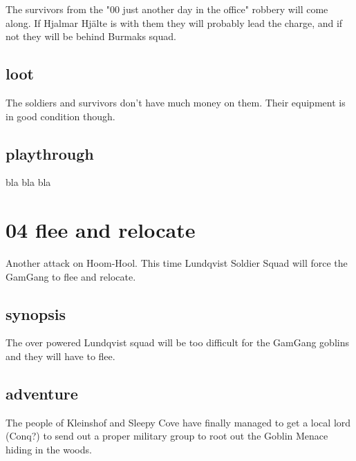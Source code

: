 The survivors from the "00 just another day in the office" robbery will come along. If Hjalmar Hjälte is with them they will probably lead the charge, and if not they will be behind Burmaks squad.


\subsection*{loot}

The soldiers and survivors don't have much money on them. Their equipment is in good condition though.


\subsection*{playthrough}

bla bla bla









\newpage
\section*{04 flee and relocate}


Another attack on Hoom-Hool. This time Lundqvist Soldier Squad will force the GamGang to flee and relocate.


\subsection*{synopsis}

The over powered Lundqvist squad will be too difficult for the GamGang goblins and they will have to flee.


\subsection*{adventure}

The people of Kleinshof and Sleepy Cove have finally managed to get a local lord (Conq?) to send out a proper military group to root out the Goblin Menace hiding in the woods.

